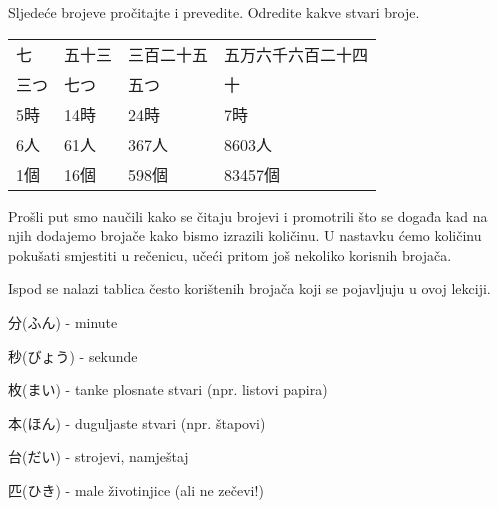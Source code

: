 	
	Sljedeće brojeve pročitajte i prevedite. Odredite kakve stvari broje.
	
	\vspace{5pt}
	\begin{tabular}{l l l l}
		七	&	五十三	&	三百二十五	&	五万六千六百二十四	\\
		三つ	&	七つ	&	五つ			&	十	\\
		5時	&	14時	&	24時			&	7時	\\
		6人	&	61人	&	367人		&	8603人	\\
		1個	&	16個	&	598個		&	83457個	\\
	\end{tabular}

	
\newpage
{}

	
	Prošli put smo naučili kako se čitaju brojevi i promotrili što se događa kad na njih dodajemo brojače kako bismo izrazili količinu. U nastavku ćemo količinu pokušati smjestiti u rečenicu, učeći pritom još nekoliko korisnih brojača.
	
	
	Ispod se nalazi tablica često korištenih brojača koji se pojavljuju u ovoj lekciji.
	
	\begin{hyou}
		\item 分(ふん) - minute
		\item 秒(びょう) - sekunde
		\item 枚(まい) - tanke plosnate stvari (npr. listovi papira)
		\item 本(ほん) - duguljaste stvari (npr. štapovi)
		\item 台(だい) - strojevi, namještaj
		\item 匹(ひき) - male životinjice (ali ne zečevi!)
	\end{hyou}

